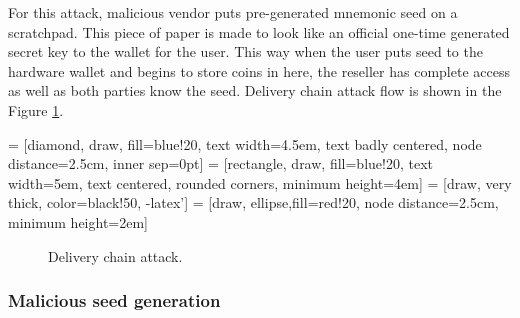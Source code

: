 \documentclass[
  printed, %
  table,   %
  lof,     %
  lot,     %
           oneside, color
]{fithesis3}
\begin{document}
For this attack, malicious vendor puts pre-generated mnemonic seed on a scratchpad. This piece of paper is made to look like an official one-time generated secret key to the wallet for the user. This way when the user puts seed to the hardware wallet and begins to store coins in here, the reseller has complete access as well as both parties know the seed. Delivery chain attack flow is shown in the Figure \ref{pict:delivery-chain-attack}.

 = [diamond, draw, fill=blue!20,
    text width=4.5em, text badly centered, node distance=2.5cm, inner sep=0pt]
 = [rectangle, draw, fill=blue!20,
    text width=5em, text centered, rounded corners, minimum height=4em]
 = [draw, very thick, color=black!50, -latex']
 = [draw, ellipse,fill=red!20, node distance=2.5cm,
    minimum height=2em]
\begin{figure}[H]
\center
{}
\caption{Delivery chain attack.}
\label{pict:delivery-chain-attack}
\end{figure}
\subsubsection{Malicious seed generation}
\end{document}
